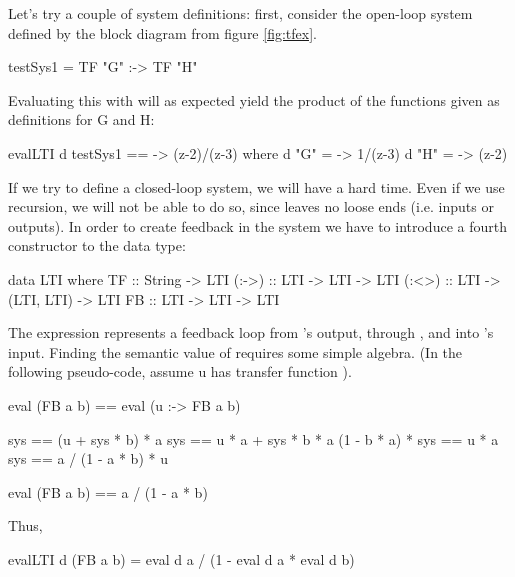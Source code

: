 Let's try a couple of system definitions:
first, consider the open-loop system defined by the block diagram from figure \ref{fig:tfex}.
\begin{code}
testSys1 = TF "G" :-> TF "H"
\end{code}
Evaluating this with  will as expected yield the product of the functions given as definitions for G and H:
\begin{codeeq}
evalLTI d testSys1 == \z -> (z-2)/(z-3) where
  d "G" = \z -> 1/(z-3)
  d "H" = \z -> (z-2)
\end{codeeq}

If we try to define a closed-loop system, we will have a hard time. Even if we use recursion, we will not be able to do so, since \cmd{:<>} leaves no loose ends (i.e. inputs or outputs). In order to create feedback in the system we have to introduce a fourth constructor to the  data type:
\begin{code}
data LTI where
  TF    :: String -> LTI
  (:->) :: LTI -> LTI -> LTI
  (:<>) :: LTI -> (LTI, LTI) -> LTI
  FB    :: LTI -> LTI -> LTI
\end{code}
The expression  represents a feedback loop from 's output, through , and into 's input.
Finding the semantic value of  requires some simple algebra. (In the following pseudo-code, assume u has transfer function ).
\begin{codeeq}
eval (FB a b) == eval (u :-> FB a b)

sys == (u + sys * b) * a
sys == u * a + sys * b * a
(1 - b * a) * sys == u * a
sys == a / (1 - a * b) * u

eval (FB a b) == a / (1 - a * b)
\end{codeeq}
Thus,
\begin{code}
evalLTI d (FB a b) = eval d a / (1 - eval d a * eval d b)
\end{code}


